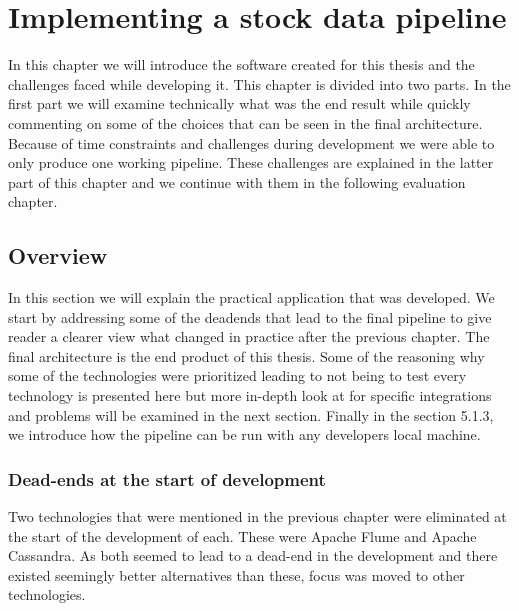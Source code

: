 \chapter{Implementing a stock data pipeline}
\label{chapter:implementation}



In this chapter we will introduce the software created for this thesis and the challenges faced while developing it.
This chapter is divided into two parts.
In the first part we will examine technically what was the end result while quickly commenting on some of the choices that can be seen in the final architecture.
Because of time constraints and challenges during development we were able to only produce one working pipeline.
These challenges are explained in the latter part of this chapter and we continue with them in the following evaluation chapter.

\section{Overview}

In this section we will explain the practical application that was developed.
We start by addressing some of the deadends that lead to the final pipeline to give reader a clearer view what changed in practice after the previous chapter.
The final architecture is the end product of this thesis.
Some of the reasoning why some of the technologies were prioritized leading to not being to test every technology is presented here but more in-depth look at for specific integrations and problems will be examined in the next section.
Finally in the section 5.1.3, we introduce how the pipeline can be run with any developers local machine.


\subsection{Dead-ends at the start of development}

Two technologies that were mentioned in the previous chapter were eliminated at the start of the development of each.
These were Apache Flume and Apache Cassandra.
As both seemed to lead to a dead-end in the development and there existed seemingly better alternatives than these, focus was moved to other technologies.

